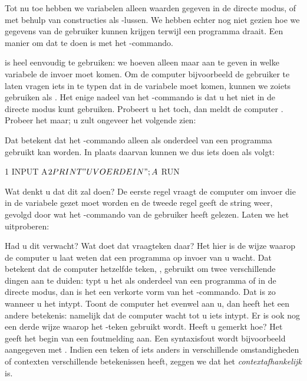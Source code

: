 Tot nu toe hebben we variabelen alleen waarden gegeven in de directe modus, of met behulp van constructies als -lussen. We hebben echter nog niet gezien hoe we gegevens van de gebruiker kunnen krijgen terwijl een programma draait. Een manier om dat te doen is met het
-commando.

\needspace{4cm} %
 is heel eenvoudig te gebruiken: we hoeven alleen maar aan te geven in welke variabele de invoer moet komen. Om de computer bijvoorbeeld de gebruiker te laten vragen iets in te typen dat in de variabele  moet komen, kunnen we zoiets gebruiken als . Het enige nadeel van het -commando is dat u het niet in de directe modus kunt gebruiken. Probeert u het toch, dan meldt de computer . Probeer het maar; u zult ongeveer het volgende zien:


\needspace{4cm}
Dat betekent dat het -commando alleen als onderdeel van een programma gebruikt kan worden. In plaats daarvan kunnen we dus iets doen als volgt:

\begin{screencode}
1 INPUT A$
2 PRINT "U VOERDE IN "; A$
RUN
\end{screencode}

\needspace{4cm}
Wat denkt u dat dit zal doen? De eerste regel vraagt de computer om invoer die in de variabele  gezet moet worden en de tweede regel geeft de string  weer, gevolgd door wat het -commando van de gebruiker heeft gelezen. Laten we het uitproberen:


Had u dit verwacht? Wat doet dat vraagteken daar? Het  hier is de wijze waarop de computer u laat weten dat een programma op invoer van u wacht. Dat betekent dat de computer hetzelfde teken, , gebruikt om twee verschillende dingen aan te duiden: typt u het als onderdeel van een programma of in de directe modus, dan is het een verkorte vorm van het -commando. Dat is zo wanneer u het intypt. Toont de computer het evenwel aan u, dan heeft het een andere betekenis: namelijk dat de computer wacht tot u iets intypt. Er is ook nog een derde wijze waarop het -teken gebruikt wordt. Heeft u gemerkt hoe? Het geeft het begin van een foutmelding aan. Een syntaxisfout wordt bijvoorbeeld aangegeven met . Indien een teken of iets anders in verschillende omstandigheden of contexten verschillende betekenissen heeft, zeggen we dat het {\em contextafhankelijk} is.

